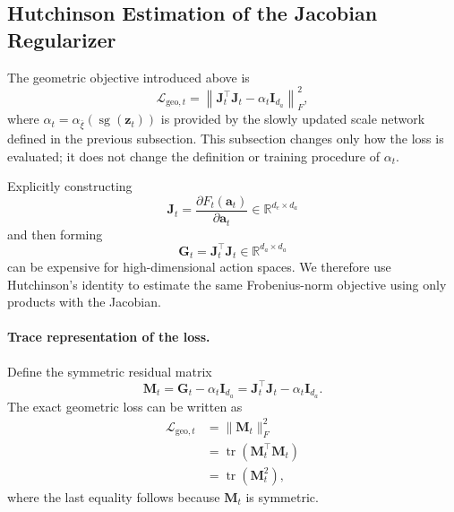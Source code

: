 ﻿\documentclass{article}
\begin{document}
\subsection{Hutchinson Estimation of the Jacobian Regularizer}

The geometric objective introduced above is
\[
\mathcal{L}_{\mathrm{geo},t}
=
\left\|
\mathbf{J}_t^{\top}\mathbf{J}_t
-
\alpha_t\mathbf{I}_{d_a}
\right\|_F^2,
\]
where \(\alpha_t=\alpha_{\bar\xi}(\operatorname{sg}(\mathbf{z}_t))\) is
provided by the slowly updated scale network defined in the previous
subsection. This subsection changes only how the loss is evaluated; it does
not change the definition or training procedure of \(\alpha_t\).

Explicitly constructing
\[
\mathbf{J}_t
=
\frac{\partial F_t(\mathbf{a}_t)}{\partial \mathbf{a}_t}
\in\mathbb{R}^{d_e\times d_a}
\]
and then forming
\[
\mathbf{G}_t
=
\mathbf{J}_t^{\top}\mathbf{J}_t
\in\mathbb{R}^{d_a\times d_a}
\]
can be expensive for high-dimensional action spaces. We therefore use
Hutchinson's identity to estimate the same Frobenius-norm objective using
only products with the Jacobian.

\paragraph{Trace representation of the loss.}
Define the symmetric residual matrix
\[
\mathbf{M}_t
=
\mathbf{G}_t-
\alpha_t\mathbf{I}_{d_a}
=
\mathbf{J}_t^{\top}\mathbf{J}_t
-
\alpha_t\mathbf{I}_{d_a}.
\]
The exact geometric loss can be written as
\[
\begin{aligned}
\mathcal{L}_{\mathrm{geo},t}
&=
\|\mathbf{M}_t\|_F^2 \\
&=
\operatorname{tr}(\mathbf{M}_t^{\top}\mathbf{M}_t) \\
&=
\operatorname{tr}(\mathbf{M}_t^2),
\end{aligned}
\]
where the last equality follows because \(\mathbf{M}_t\) is symmetric.
\end{document}
